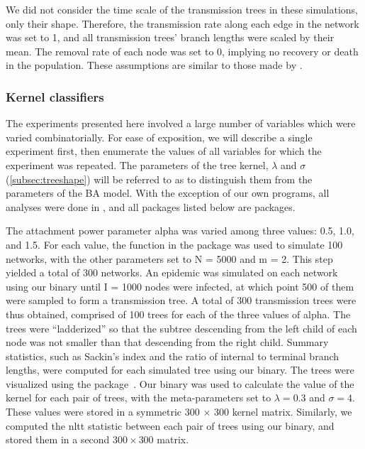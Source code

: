 We did not consider the time scale of the transmission trees in these
simulations, only their shape. Therefore, the transmission rate along each edge
in the network was set to 1, and all transmission trees' branch lengths were
scaled by their mean. The removal rate of each node was set to 0, implying no
recovery or death in the population. These assumptions are similar to those
made by \textcite{leventhal2012inferring}.

\subsubsection*{Kernel classifiers}
\label{subsec:kernel}

The experiments presented here involved a large number of variables which were
varied combinatorially. For ease of exposition, we will describe a single
experiment first, then enumerate the values of all variables for which the
experiment was repeated. The parameters of the tree kernel, $\lambda$ and
$\sigma$ (\cref{subsec:treeshape}) will be referred to as
 to distinguish them from the parameters of the \gls{BA}
model. With the exception of our own programs, all analyses were done in
, and all packages listed below are  packages.

The attachment power parameter \gls{alpha} was varied among three values: 0.5,
1.0, and 1.5. For each value, the  function in the
 package was used to simulate 100 networks, with the other
parameters set to \gls{N} = 5000 and \gls{m} = 2. This step yielded a total of
300 networks. An epidemic was simulated on each network using our
 binary until \gls{I} = 1000 nodes were infected, at which
point 500 of them were sampled to form a transmission tree. A total of 300
transmission trees were thus obtained, comprised of 100 trees for each of the
three values of \gls{alpha}. The trees were ``ladderized'' so that the subtree
descending from the left child of each node was not smaller than that
descending from the right child. Summary statistics, such as Sackin's index and
the ratio of internal to terminal branch lengths, were computed for each
simulated tree using our  binary. The trees were visualized
using the  package~\autocite{paradis2004ape}. Our
 binary was used to calculate the value of the kernel for
each pair of trees, with the meta-parameters set to $\lambda = 0.3$ and $\sigma
= 4$. These values were stored in a symmetric 300 $\times$ 300 kernel matrix.
Similarly, we computed the \gls{nltt} statistic between each pair of trees
using our  binary, and stored them in a second $300 \times
300$ matrix.


